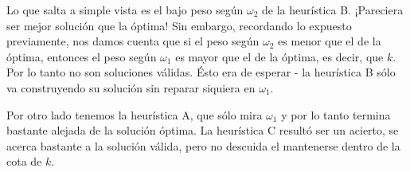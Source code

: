 Lo que salta a simple vista es el bajo peso según $\omega_2$ de la heurística B. ¡Pareciera ser mejor solución que la óptima! Sin embargo,
recordando lo expuesto previamente, nos damos cuenta que si el peso según $\omega_2$ es menor que el de la óptima, entonces el peso según
$\omega_1$ es mayor que el de la óptima, es decir, que $k$. Por lo tanto no son soluciones válidas.
Ésto era de esperar - la heurística B sólo va construyendo su solución sin reparar siquiera en $\omega_1$.

Por otro lado tenemos la heurística A, que sólo mira $\omega_1$ y por lo tanto termina bastante alejada de la solución óptima. La heurística
C resultó ser un acierto, se acerca bastante a la solución válida, pero no descuida el mantenerse dentro de la cota de $k$.
